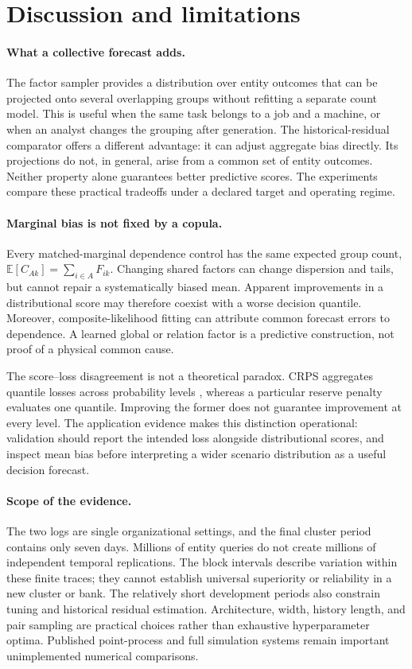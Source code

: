 \section{Discussion and limitations}
\paragraph{What a collective forecast adds.}
The factor sampler provides a distribution over entity outcomes that can be
projected onto several overlapping groups without refitting a separate count
model. This is useful when the same task belongs to a job and a machine, or
when an analyst changes the grouping after generation. The historical-residual
comparator offers a different advantage: it can adjust aggregate bias directly.
Its projections do not, in general, arise from a common set of entity outcomes.
Neither property alone guarantees better predictive scores. The experiments
compare these practical tradeoffs under a declared target and operating regime.

\paragraph{Marginal bias is not fixed by a copula.}
Every matched-marginal dependence control has the same expected group count,
$\mathbb E[C_{Ak}]=\sum_{i\in A}F_{ik}$. Changing shared factors can change
dispersion and tails, but cannot repair a systematically biased mean. Apparent
improvements in a distributional score may therefore coexist with a worse
decision quantile. Moreover, composite-likelihood fitting can attribute common
forecast errors to dependence. A learned global or relation factor is a
predictive construction, not proof of a physical common cause.

The score--loss disagreement is not a theoretical paradox. CRPS aggregates
quantile losses across probability levels \citep{gneiting2007}, whereas a
particular reserve penalty evaluates one quantile. Improving the former does
not guarantee improvement at every level. The application evidence makes this
distinction operational: validation should report the intended loss alongside
distributional scores, and inspect mean bias before interpreting a wider
scenario distribution as a useful decision forecast.

\paragraph{Scope of the evidence.}
The two logs are single organizational settings, and the final cluster period
contains only seven days. Millions of entity queries do not create millions of
independent temporal replications. The block intervals describe variation
within these finite traces; they cannot establish universal superiority or
reliability in a new cluster or bank. The relatively short development periods
also constrain tuning and historical residual estimation. Architecture, width,
history length, and pair sampling are practical choices rather than exhaustive
hyperparameter optima. Published point-process and full simulation systems
remain important unimplemented numerical comparisons.

